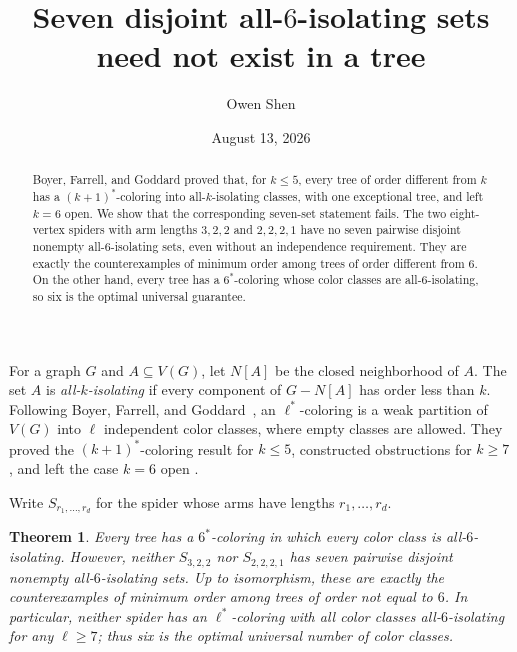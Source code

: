 \documentclass[11pt]{amsart}
\title{Seven disjoint all-\texorpdfstring{$6$}{6}-isolating sets need not exist in a tree}
\author{Owen Shen}
\date{August 13, 2026}
\newtheorem{theorem}{Theorem}
\begin{document}
\begin{abstract}
Boyer, Farrell, and Goddard proved that, for $k\leq 5$, every tree of order
different from $k$ has a $(k+1)^{*}$-coloring into all-$k$-isolating classes,
with one exceptional tree, and left $k=6$ open.  We show that the corresponding
seven-set statement fails.  The two eight-vertex spiders with arm lengths
$3,2,2$ and $2,2,2,1$ have no seven pairwise disjoint nonempty
all-$6$-isolating sets, even without an independence requirement.  They are
exactly the counterexamples of minimum order among trees of order different
from $6$.  On the other hand, every tree has a $6^{*}$-coloring whose color
classes are all-$6$-isolating, so six is the optimal universal guarantee.
\end{abstract}

\maketitle

For a graph $G$ and $A\subseteq V(G)$, let $N[A]$ be the closed neighborhood
of $A$.  The set $A$ is \emph{all-$k$-isolating} if every component of
$G-N[A]$ has order less than $k$.  Following Boyer, Farrell, and
Goddard~\cite{BFG}, an $\ell^{*}$-coloring is a weak partition of $V(G)$ into
$\ell$ independent color classes, where empty classes are allowed.  They
proved the $(k+1)^{*}$-coloring result for $k\leq 5$, constructed obstructions
for $k\geq 7$, and left the case $k=6$ open
\cite[Theorem~7 and the paragraph following Lemma~8]{BFG}.

Write $S_{r_1,\ldots,r_d}$ for the spider whose arms have lengths
$r_1,\ldots,r_d$.

\begin{theorem}
Every tree has a $6^{*}$-coloring in which every color class is
all-$6$-isolating.  However, neither $S_{3,2,2}$ nor $S_{2,2,2,1}$ has seven
pairwise disjoint nonempty all-$6$-isolating sets.  Up to isomorphism, these
are exactly the counterexamples of minimum order among trees of order
not equal to $6$.  In particular, neither spider has an $\ell^{*}$-coloring
with all color classes all-$6$-isolating for any $\ell\geq 7$; thus six is
the optimal universal number of color classes.
\end{theorem}
\end{document}
